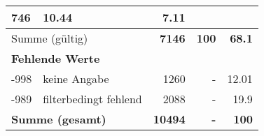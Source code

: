 \begin{longtable}{lXrrr}
       \num{746} &
       \num[round-mode=places,round-precision=2]{10,44} &
         \num[round-mode=places,round-precision=2]{7,11} \\
     \midrule
     \multicolumn{2}{l}{Summe (gültig)} &
       \textbf{\num{7146}} &
     \textbf{100} &
       \textbf{\num[round-mode=places,round-precision=2]{68,1}} \\
     \multicolumn{5}{l}{\textbf{Fehlende Werte}}\\
       -998 &
       keine Angabe &
         \num{1260} &
        - &
         \num[round-mode=places,round-precision=2]{12,01} \\
       -989 &
       filterbedingt fehlend &
         \num{2088} &
        - &
         \num[round-mode=places,round-precision=2]{19,9} \\
     \midrule
     \multicolumn{2}{l}{\textbf{Summe (gesamt)}} &
          \textbf{\num{10494}} &
        \textbf{-} &
        \textbf{100} \\
     \bottomrule
     \end{longtable}
     

